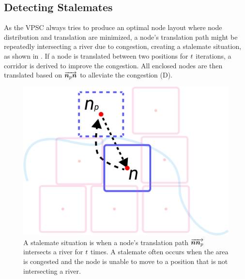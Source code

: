 \subsection{Detecting Stalemates}

As the VPSC always tries to produce an optimal node layout where node distribution and translation are minimized, a node's translation path might be repeatedly intersecting a river due to congestion, creating a stalemate situation, as shown in . If a node is translated between two positions for $ t $ iterations, a corridor is derived to improve the congestion.  All enclosed nodes are then translated based on $ \protect\overrightarrow{\bm{n}_{p}\bm{n}} $ to alleviate the congestion (D).

{
\begin{figure}[tb!]
    \centering
    \includegraphics[width=\columnwidth]{figure/stalemate.png}
    \caption{A stalemate situation is when a node's translation path $ \protect\overrightarrow{\bm{n}\bm{n}_{p}} $ intersects a river for $ t $ times. A stalemate often occurs when the area is congested and the node is unable to move to a position that is not intersecting a river.}
    \label{fig:stalemate}
\end{figure}
}

